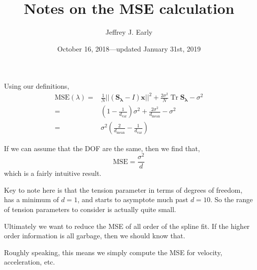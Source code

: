 \documentclass[11pt]{article}
\title{Notes on the MSE calculation}
\author{Jeffrey J. Early}
\date{October 16, 2018---updated January 31st, 2019}                                           %
\DeclareMathOperator{\Tr}{Tr}
\begin{document}
\maketitle

Using our definitions,
\begin{align}
    \textrm{MSE}(\lambda) =& \frac{1}{N} || \left( \mathbf{S_\lambda} - I \right) \mathbf{x} ||^2 + \frac{2 \sigma^2}{N}  \Tr \mathbf{S_\lambda} - \sigma^2 \\
    =&  \left(1-\frac{1}{d_{\textrm{var}}} \right)\sigma^2 + \frac{2 \sigma^2}{d_\textrm{mean}} - \sigma^2 \\
    =& \sigma^2 \left( \frac{2}{d_\textrm{mean}} -\frac{1}{d_{\textrm{var}}} \right)
\end{align}

If we can assume that the DOF are the same, then we find that,
\begin{equation}
    \textrm{MSE} = \frac{\sigma^2}{d}
\end{equation}
which is a fairly intuitive result.

Key to note here is that the tension parameter in terms of degrees of freedom, has a minimum of $d=1$, and starts to asymptote much past $d=10$. So the range of tension parameters to consider is actually quite small.

Ultimately we want to reduce the MSE of all order of the spline fit. If the higher order information is all garbage, then we should know that.

Roughly speaking, this means we simply compute the MSE for velocity, acceleration, etc.
\end{document}
